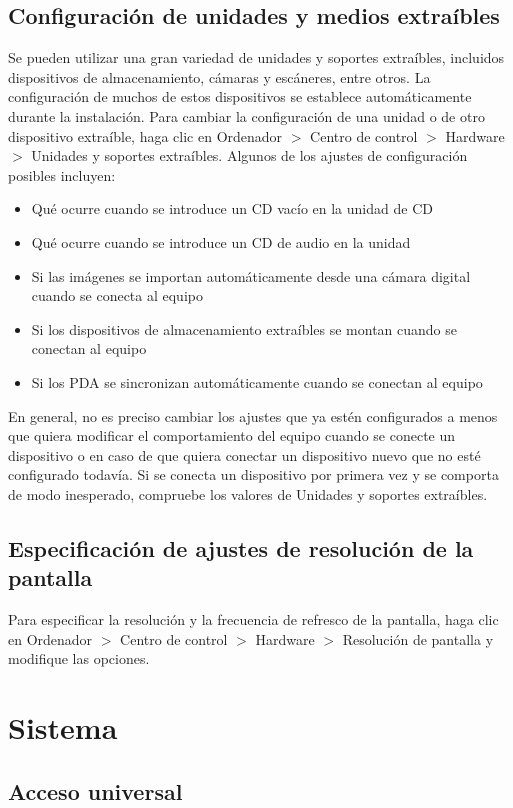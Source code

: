 \documentclass[12pt,letterpaper]{book}
\begin{document}
\subsection{Configuración de unidades y medios extraíbles}
Se pueden utilizar una gran variedad de unidades y soportes extraíbles, incluidos dispositivos de almacenamiento, cámaras y escáneres, entre otros. La configuración de muchos de estos dispositivos se establece automáticamente durante la instalación. Para cambiar la configuración de una unidad o de otro dispositivo extraíble, haga clic en Ordenador $>$ Centro de control $>$ Hardware $>$ Unidades y soportes extraíbles.
Algunos de los ajustes de configuración posibles incluyen:
\begin{itemize}
\item Qué ocurre cuando se introduce un CD vacío en la unidad de CD
\item Qué ocurre cuando se introduce un CD de audio en la unidad
\item Si las imágenes se importan automáticamente desde una cámara digital cuando se conecta al equipo
\item Si los dispositivos de almacenamiento extraíbles se montan cuando se conectan al equipo
\item Si los PDA se sincronizan automáticamente cuando se conectan al equipo
\end{itemize}
En general, no es preciso cambiar los ajustes que ya estén configurados a menos que quiera modificar el comportamiento del equipo cuando se conecte un dispositivo o en caso de que quiera conectar un dispositivo nuevo que no esté configurado todavía. Si se conecta un dispositivo por primera vez y se comporta de modo inesperado, compruebe los valores de Unidades y soportes extraíbles.
\subsection{Especificación de ajustes de resolución de la pantalla}
Para especificar la resolución y la frecuencia de refresco de la pantalla, haga clic en Ordenador $>$ Centro de control $>$ Hardware $>$ Resolución de pantalla y modifique las
opciones.
\section{Sistema}
\subsection{Acceso universal}
\end{document}
